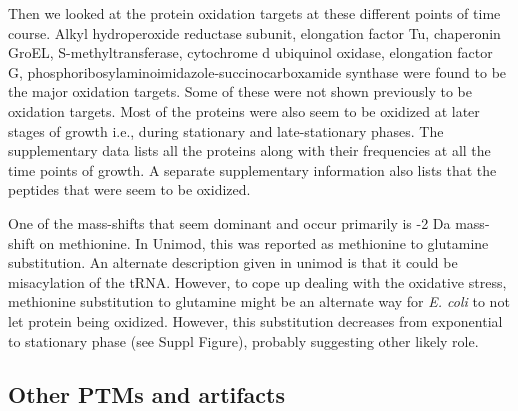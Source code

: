 \documentclass[12pt]{article}
\begin{document}
Then we looked at the protein oxidation targets at these different points of time course. Alkyl hydroperoxide reductase subunit, elongation factor Tu, chaperonin GroEL, S-methyltransferase, cytochrome d ubiquinol oxidase, elongation factor G, phosphoribosylaminoimidazole-succinocarboxamide synthase were found to be the major oxidation targets. Some of these were not shown previously to be oxidation targets. Most of the proteins were also seem to be oxidized at later stages of growth i.e., during stationary and late-stationary phases. The supplementary data lists all the proteins along with their frequencies at all the time points of growth. A separate supplementary information also lists that the peptides that were seem to be oxidized.

One of the mass-shifts that seem dominant and occur primarily is -2 Da mass-shift on methionine. In Unimod, this was reported as methionine to glutamine substitution. An alternate description given in unimod is that it could be misacylation of the tRNA. However, to cope up dealing with the oxidative stress, methionine substitution to glutamine might be an alternate way for \emph{E. coli} to not let protein being oxidized. However, this substitution decreases from exponential to stationary phase (see Suppl Figure), probably suggesting other likely role.

\subsection{Other PTMs and artifacts}
\end{document}
